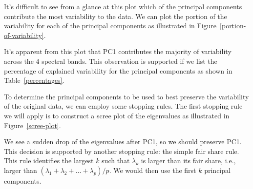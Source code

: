 \documentclass[conference,compsoc]{IEEEtran}
\begin{document}
It's difficult to see from a glance at this plot which of the principal components contribute the most variability to the data. We can plot the
portion of the variability for each of the principal components as illustrated in Figure~\ref{portion-of-variability}.



It's apparent from this plot that PC1 contributes the majority of variability across the 4 spectral bands. This observation is supported 
if we list the percentage of explained variability for the principal components as shown in Table~\ref{percentages}.



To determine the principal components to be used to best preserve the variability of the original data, we can employ some stopping rules.
The first stopping rule we will apply is to construct a scree plot of the eigenvalues as illustrated in Figure~\ref{scree-plot}.


We see a sudden drop of the eigenvalues after PC1, so we should preserve PC1. This decision is supported by another stopping rule: the
simple fair share rule. This rule identifies the largest $k$ such that $\lambda_k$ is larger than its fair share, i.e., larger than 
$(\lambda_1 + \lambda_2 + ... + \lambda_p)/p$. We would then use the first $k$ principal components. \cite{bajorski}
\end{document}
